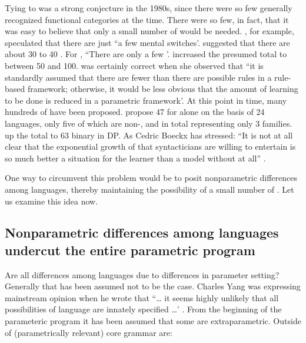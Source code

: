 \documentclass[output=paper,
modfonts
]{LSP/langsci}
\begin{document}
Tying  to  was a strong conjecture in the
1980s, since there were so few generally recognized functional
categories at the time. There were so few, in fact, that it was easy to
believe that only a small number of  would be needed. \citet[112]{pinker1994}, for example, speculated that there are just ``a few mental
switches'. \citet[259]{lightfoot1999} suggested that there are about 30 to 40
. For \citet[16]{adger2003n}, ``There are only a few '.
\citet{roberts2005} increased the presumed total to between 50
and 100. \citet[734]{fodor2001} was certainly correct when she observed that
``it is standardly assumed that there are fewer  than there are
possible rules in a rule-based framework; otherwise, it would be less
obvious that the amount of learning to be done is reduced in a
parametric framework'. At this point in time, many hundreds of
 have been proposed. \citet{gianollo2008} propose 47  for  alone on the basis of 24 languages,
only five of which are non-, and in total representing only
3 families. \citet{longobardi2011} up the total to 63 binary
 in DP. As Cedric Boeckx has stressed: ``It is not at all clear
that the exponential growth of  that syntacticians are willing
to entertain is so much better a situation for the learner than a model
without  at all'' \citep[157]{boeckx2014}.

One way to circumvent this problem would be to posit nonparametric
differences among languages, thereby maintaining the possibility of a
small number of . Let us examine this idea now.

\subsection{Nonparametric differences among languages undercut the entire
parametric program}

Are all  differences among languages due to differences
in parameter setting? Generally that has been assumed not to be the
case. Charles Yang was expressing mainstream opinion when he wrote that
``\ldots{} it seems highly unlikely that all possibilities of language
 are innately specified \ldots{}' \citep[191]{yang2011n}. From the
beginning of the parameteric program it has been assumed that some
 are extraparametric. Outside of (parametrically relevant) core
grammar are:
\end{document}
